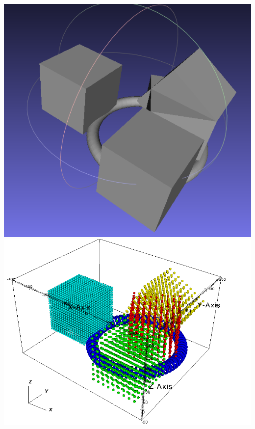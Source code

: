 \begin{minipage}[t]{0.35\textwidth}
  \vspace{0pt}
  \centering
  \includegraphics[width=0.9\columnwidth]{FIGS/geometry/geom_abaqus_1.png}
  \includegraphics[width=0.9\columnwidth]{FIGS/geometry/geom_abaqus.png}
\end{minipage}

